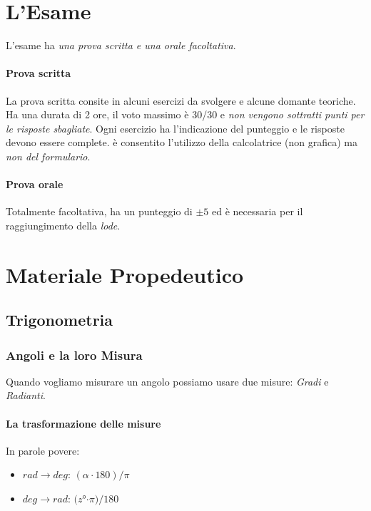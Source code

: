 \documentclass[12pt, a4paper, openany]{book}
\begin{document}
\section{L'Esame}
L'esame ha \emph{una prova scritta e una orale facoltativa}.
\paragraph*{Prova scritta}
La prova scritta consite in alcuni esercizi da svolgere e alcune domante teoriche.
Ha una durata di 2 ore, il voto massimo è 30/30 e \emph{non vengono sottratti punti per le risposte sbagliate}.
Ogni esercizio ha l'indicazione del punteggio e le risposte devono essere complete.
è consentito l'utilizzo della calcolatrice (non grafica) ma \emph{non del formulario}.
\paragraph*{Prova orale}
Totalmente facoltativa, ha un punteggio di $\pm 5$ ed è necessaria per il raggiungimento della \emph{lode}.

\section{Materiale Propedeutico}
\subsection{Trigonometria}
\subsubsection{Angoli e la loro Misura}
Quando vogliamo misurare un angolo possiamo usare due misure: \emph{Gradi} e \emph{Radianti}.
\paragraph*{La trasformazione delle misure}
In parole povere:
\begin{itemize}
    \item $rad \to deg$: $(\alpha \cdot 180)/\pi$
    \item $deg \to rad$: $(z$°$ \cdot \pi)/180$
\end{itemize}
\end{document}
